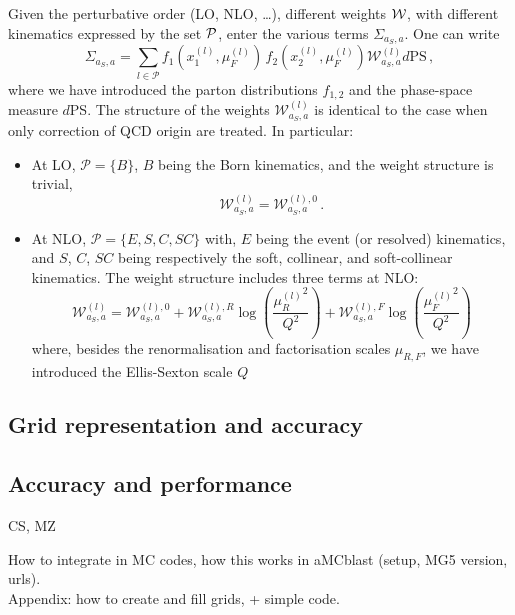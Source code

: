 Given the perturbative order (LO, NLO, \ldots), different weights $\cal W$, with different kinematics expressed by the set $\cal P$, enter the various
terms $\Sigma_{a_S, a}$. One can write
\begin{equation}
    \Sigma_{a_S, a}= \sum_{l\in \mathcal P} f_1(x_1^{(l)},\mu_F^{(l)}) \,f_2(x_2^{(l)},\mu_F^{(l)}) \mathcal W^{(l)}_{a_S, a}
    d \textrm{PS}\,,
\end{equation}
where we have introduced the parton distributions $f_{1,2}$ and the phase-space measure $d$PS. The structure of the weights $ \mathcal W^{(l)}_{a_S, a}$ is 
identical to the case when only correction of QCD origin are treated. In particular:
\begin{itemize}
    \item At LO, $\mathcal P = \{B\}$, $B$ being the Born kinematics, and the weight structure is trivial,
    \begin{equation}
        \mathcal W^{(l)}_{a_S, a} = {\mathcal W^{(l),0}_{a_S, a}}\,.
    \end{equation}
    \item At NLO, $\mathcal P = \{E, S, C, SC\}$ with, $E$ being the event (or resolved) kinematics, and $S$, $C$, $SC$ being
        respectively the soft, collinear, and soft-collinear kinematics. The weight structure includes three terms at NLO:
    \begin{equation}
        \mathcal W^{(l)}_{a_S, a} = {{\mathcal W}^{(l),0}_{a_S, a}} +
                                {\mathcal W^{(l),R}_{a_S, a}} \log\left(\frac{{\mu_R^{(l)}}^2}{Q^2}\right) +
                                {\mathcal W^{(l),F}_{a_S, a}} \log\left(\frac{{\mu_F^{(l)}}^2}{Q^2}\right)
    \end{equation}
    where, besides the renormalisation and factorisation scales $\mu_{R,F}$, we have introduced the Ellis-Sexton scale $Q$
\end{itemize}

\subsection{Grid representation and accuracy}
\label{sec:grid-representation}

\subsection{Accuracy and performance}
\label{sec:accuracy-and-performance}

CS, MZ

How to integrate in MC codes, how this works in aMCblast (setup, MG5 version, urls).\\
Appendix: how to create and fill grids, + simple code.
